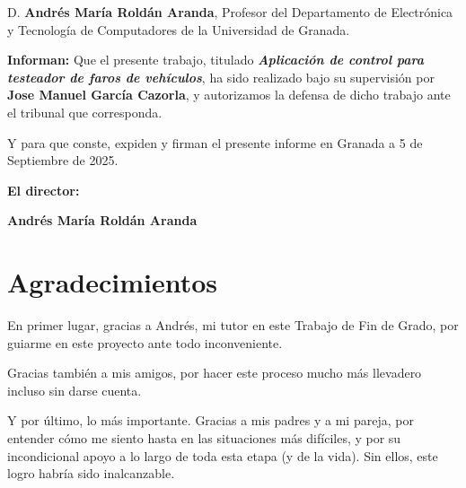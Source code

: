 D. \textbf{Andrés María Roldán Aranda}, Profesor del Departamento de Electrónica y Tecnología de Computadores de la Universidad de Granada.

\vspace{0.5cm}

\textbf{Informan:}
Que el presente trabajo, titulado \textit{\textbf{Aplicación de control para testeador de faros de vehículos}}, ha sido realizado bajo su supervisión por \textbf{Jose Manuel García Cazorla}, y autorizamos la defensa de dicho trabajo ante el tribunal que corresponda.

\vspace{0.5cm}

Y para que conste, expiden y firman el presente informe en Granada a 5 de Septiembre de 2025.

\vspace{1cm}

\textbf{El director:}

\vspace{5cm}

\noindent\textbf{Andrés María Roldán Aranda}

\chapter*{Agradecimientos}

En primer lugar, gracias a Andrés, mi tutor en este Trabajo de Fin de Grado, por guiarme en este proyecto ante todo inconveniente.

Gracias también a mis amigos, por hacer este proceso mucho más llevadero incluso sin darse cuenta.

Y por último, lo más importante. Gracias a mis padres y a mi pareja, por entender cómo me siento hasta en las situaciones más difíciles, y por su incondicional apoyo a lo largo de toda esta etapa (y de la vida). Sin ellos, este logro habría sido inalcanzable.

\thispagestyle{empty}

\vspace{1cm}
